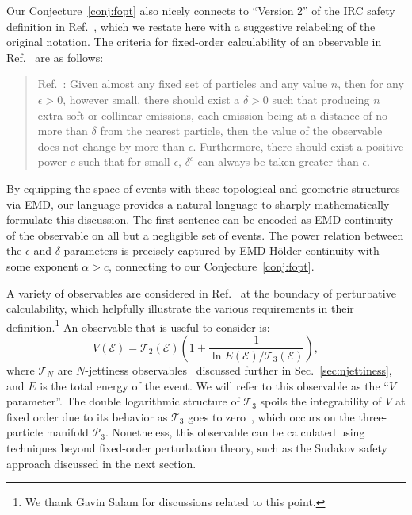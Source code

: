 \documentclass[letterpaper,11pt]{article}
\DeclareRobustCommand{\Sec}[1]{Sec.~\ref{#1}}
\DeclareRobustCommand{\Ref}[1]{Ref.~\cite{#1}}
\begin{document}
Our Conjecture~\ref{conj:fopt} also nicely connects to ``Version 2'' of the IRC safety definition in \Ref{Banfi:2004yd}, which we restate here with a suggestive relabeling of the original notation.
%
The criteria for fixed-order calculability of an observable in \Ref{Banfi:2004yd} are as follows:
\begin{quote}
\Ref{Banfi:2004yd}: Given almost any fixed set of particles and any value $n$, then for any $\epsilon>0$, however small, there should exist a $\delta>0$ such that producing $n$ extra soft or collinear emissions, each emission being at a distance of no more than $\delta$ from the nearest particle, then the value of the observable does not change by more than $\epsilon$. Furthermore, there should exist a positive power $c$ such that for small $\epsilon$, $\delta^c$ can always be taken greater than $\epsilon$.
\end{quote}
%
By equipping the space of events with these topological and geometric structures via EMD, our language provides a natural language to sharply mathematically formulate this discussion.
%
The first sentence can be encoded as EMD continuity of the observable on all but a negligible set of events.
%
The power relation between the $\epsilon$ and $\delta$ parameters is precisely captured by EMD H\"{o}lder continuity with some exponent $\alpha > c$, connecting to our Conjecture~\ref{conj:fopt}.


A variety of observables are considered in \Ref{Banfi:2004yd} at the boundary of perturbative calculability, which helpfully illustrate the various requirements in their definition.\footnote{We thank Gavin Salam for discussions related to this point.}
%
An observable that is useful to consider is:
\begin{equation}\label{eq:Vobs}
V(\mathcal E) = \mathcal T_2(\mathcal E) \left(1 + \frac{1}{\ln E(\mathcal E)/{\mathcal T_3(\mathcal E)}}\right),
\end{equation}
where $\mathcal T_N$ are $N$-jettiness observables~\cite{Stewart:2010tn} discussed further in \Sec{sec:njettiness}, and $E$ is the total energy of the event.
%
We will refer to this observable as the ``$V$ parameter''.
%
The double logarithmic structure of $\mathcal T_3$ spoils the integrability of $V$ at fixed order due to its behavior as $\mathcal T_3$ goes to zero~\cite{Banfi:2004yd}, which occurs on the three-particle manifold $\mathcal P_3$.
%
Nonetheless, this observable can be calculated using techniques beyond fixed-order perturbation theory, such as the Sudakov safety approach discussed in the next section.
\end{document}
